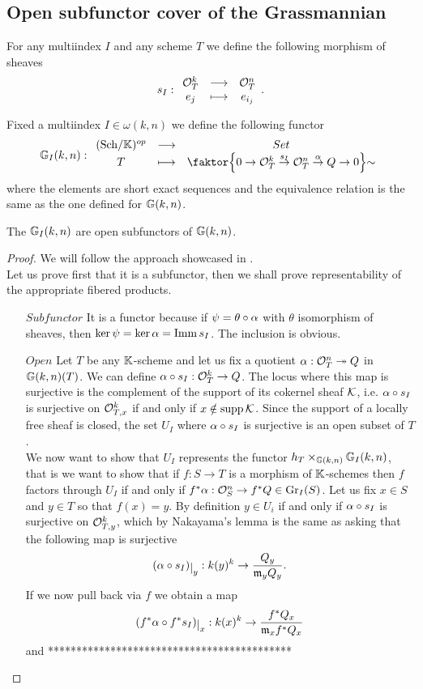 \subsection{Open subfunctor cover of the Grassmannian}
\begin{notation}
For any multiindex $I$ and any scheme $T$ we define the following morphism of sheaves
\[s_I:\begin{array}{ccc} {\mathcal{O}_T^k} & \longrightarrow & {\mathcal{O}_T^n}\\ {e_j} & \longmapsto & {e_{i_j}} \end{array}.\]
\end{notation}

\begin{definition}
Fixed a multiindex $I\in \omega(k,n)$ we define the following functor
\[\G_I(k,n):\funcDef{(\Sch\K)\op}{Set}{T}{\quot{\cpa{0\to \Oc^k_T\overset{s_I}\to\Oc_T^n\overset{\al}\to Q\to 0}}\sim}\]
where the elements are short exact sequences and the equivalence relation is the same as the one defined for $\mathbb{G}(k,n)$.
\end{definition}


\begin{proposition}\label{GrIAreOpenSubfunctors}
The $\mathbb{G}_I(k,n)$ are open subfunctors of $\mathbb{G}(k,n)$.
\end{proposition}
\begin{proof}
We will follow the approach showcased in \cite{Bejleri2}.\\
Let us prove first that it is a subfunctor, then we shall prove representability of the appropriate fibered products.
\setlength{\leftmargini}{0cm}
\begin{itemize}
\item[$\boxed{Subfunctor}$] It is a functor because if $\psi=\theta\circ \alpha$ with $\theta$ isomorphism of sheaves, then $\ker \psi=\ker\alpha=\mathrm{Imm}\, s_I$. The inclusion is obvious.
\item[$\boxed{Open}$] Let $T$ be any $\mathbb{K}$-scheme and let us fix a quotient $\alpha:\mathcal{O}_T^n\twoheadrightarrow Q$ in $\mathbb{G}(k,n)(T)$. We can define $\alpha\circ s_I:\mathcal{O}_T^k\to Q$. The locus where this map is surjective is the complement of the support of its cokernel sheaf $\mathcal{K}$, i.e. $\alpha\circ s_I$ is surjective on $\mathcal{O}_{T,x}^k$ if and only if $x\notin \mathrm{supp}\,\mathcal{K}$. Since the support of a locally free sheaf is closed, the set $U_I$ where $\alpha\circ s_I$ is surjective is an open subset of $T$.\\
We now want to show that $U_I$ represents the functor $h_T\times_{\mathbb{G}(k,n)}\mathbb{G}_I(k,n)$, that is we want to show that if $f:S\to T$ is a morphism of $\mathbb{K}$-schemes then $f$ factors through $U_I$ if and only if $f^\ast\alpha:\mathcal{O}_S^n\to f^\ast Q \in \mathrm{Gr}_I(S)$. Let us fix $x\in S$ and $y\in T$ so that $f(x)=y$. By definition $y\in U_i$ if and only if $\alpha\circ s_I$ is surjective on $\mathcal{O}_{T,y}^k$, which by Nakayama's lemma is the same as asking that the following map is surjective
\[(\al\circ s_I)\res{y}:k(y)^k\to \frac{Q_y}{\mf_y Q_y}.\]
If we now pull back via $f$ we obtain a map
\[(f^\ast \al\circ f^\ast s_I)\res{x}:k(x)^k\to\frac{f^\ast Q_x}{\mf_x f^\ast Q_x} \]
and *******************************************
\end{itemize}
\setlength{\leftmargini}{0.5cm}

\end{proof}


